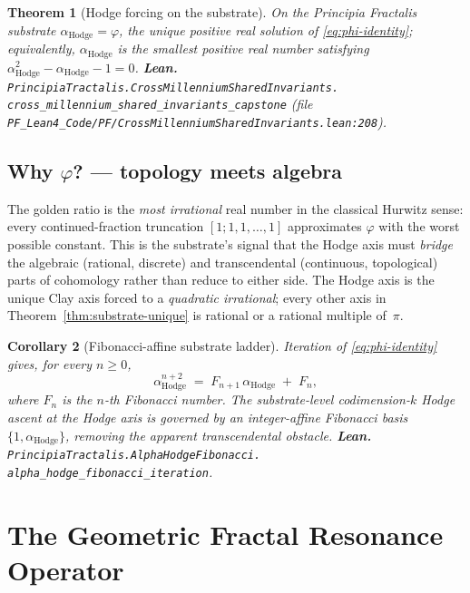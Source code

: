 \documentclass[11pt,a4paper]{article}
\theoremstyle{plain}
\newtheorem{theorem}{Theorem}[section]
\newtheorem{corollary}[theorem]{Corollary}
\theoremstyle{definition}
\begin{document}
\begin{theorem}[Hodge forcing on the substrate]
\label{thm:hodge-forcing}
On the Principia Fractalis substrate
$\alpha_{\mathrm{Hodge}} = \varphi$, the unique positive real solution
of \eqref{eq:phi-identity}; equivalently, $\alpha_{\mathrm{Hodge}}$
is the smallest positive real number satisfying
$\alpha_{\mathrm{Hodge}}^{2} - \alpha_{\mathrm{Hodge}} - 1 = 0$.
\textbf{Lean.}
\texttt{PrincipiaTractalis.CrossMillenniumSharedInvariants.\\
cross\_millennium\_shared\_invariants\_capstone}
(file \texttt{PF\_Lean4\_Code/PF/CrossMillenniumSharedInvariants.lean:208}).
\end{theorem}

\subsection{Why $\varphi$? --- topology meets algebra}

The golden ratio is the \emph{most irrational} real number in the
classical Hurwitz sense: every continued-fraction truncation
$[1; 1, 1, \ldots, 1]$ approximates $\varphi$ with the worst possible
constant. This is the substrate's signal that the Hodge axis must
\emph{bridge} the algebraic (rational, discrete) and transcendental
(continuous, topological) parts of cohomology rather than reduce to
either side. The Hodge axis is the unique Clay axis forced to a
\emph{quadratic irrational}; every other axis in
Theorem~\ref{thm:substrate-unique} is rational or a rational multiple
of~$\pi$.

\begin{corollary}[Fibonacci-affine substrate ladder]
\label{cor:fibonacci}
Iteration of \eqref{eq:phi-identity} gives, for every $n \ge 0$,
\[
\alpha_{\mathrm{Hodge}}^{n+2}
\;=\; F_{n+1}\, \alpha_{\mathrm{Hodge}} \;+\; F_{n},
\]
where $F_{n}$ is the $n$-th Fibonacci number. The substrate-level
codimension-$k$ Hodge ascent at the Hodge axis is governed by an
integer-affine Fibonacci basis $\{1, \alpha_{\mathrm{Hodge}}\}$,
removing the apparent transcendental obstacle.
\textbf{Lean.}
\texttt{PrincipiaTractalis.AlphaHodgeFibonacci.\\
alpha\_hodge\_fibonacci\_iteration}.
\end{corollary}

\section{The Geometric Fractal Resonance Operator}
\label{sec:operator}
\end{document}
